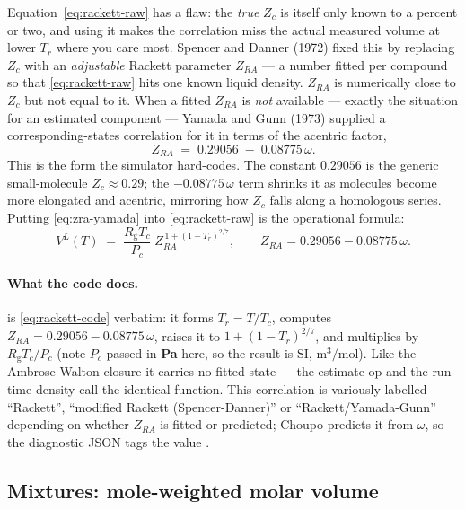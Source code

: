 \documentclass[11pt,a4paper]{article}
\newcommand{\Rgas}{R_{\!\mathrm{g}}}                %
\begin{document}
Equation~\eqref{eq:rackett-raw} has a flaw: the \emph{true} $Z_c$ is
itself only known to a percent or two, and using it makes the
correlation miss the actual measured volume at lower $T_r$ where you
care most.  Spencer and Danner (1972) fixed this by replacing $Z_c$ with
an \emph{adjustable} Rackett parameter $Z_{RA}$ --- a number fitted per
compound so that \eqref{eq:rackett-raw} hits one known liquid density.
$Z_{RA}$ is numerically close to $Z_c$ but not equal to it.  When a
fitted $Z_{RA}$ is \emph{not} available --- exactly the situation for an
estimated component --- Yamada and Gunn (1973) supplied a
corresponding-states correlation for it in terms of the acentric factor,
\begin{equation}\label{eq:zra-yamada}
   Z_{RA} \;=\; 0.29056 \;-\; 0.08775\,\omega .
\end{equation}
This is the form the simulator hard-codes.  The constant
$0.29056$ is the generic small-molecule $Z_c\approx 0.29$; the
$-0.08775\,\omega$ term shrinks it as molecules become more elongated
and acentric, mirroring how $Z_c$ falls along a homologous series.
Putting \eqref{eq:zra-yamada} into \eqref{eq:rackett-raw} is the
operational formula:
\begin{equation}\label{eq:rackett-code}
   \boxed{\;
   V^{L}(T)
   \;=\; \frac{\Rgas T_c}{P_c}\;
         Z_{RA}^{\,1+(1-T_r)^{2/7}},
   \qquad
   Z_{RA} = 0.29056 - 0.08775\,\omega .
   \;}
\end{equation}

\paragraph{What the code does.}
 is
\eqref{eq:rackett-code} verbatim: it forms $T_r=T/T_c$, computes
$Z_{RA}=0.29056-0.08775\,\omega$, raises it to $1+(1-T_r)^{2/7}$, and
multiplies by $\Rgas T_c/P_c$ (note $P_c$ passed in \textbf{Pa} here, so
the result is SI, $\mathrm{m^3/mol}$).  Like the Ambrose-Walton closure
it carries no fitted state --- the estimate op and the run-time density
call the identical function.  This correlation is variously labelled
``Rackett'', ``modified Rackett (Spencer-Danner)'' or
``Rackett/Yamada-Gunn'' depending on whether $Z_{RA}$ is fitted or
predicted; Choupo predicts it from $\omega$, so the diagnostic JSON tags
the value .

\subsection{Mixtures: mole-weighted molar volume}
\end{document}
